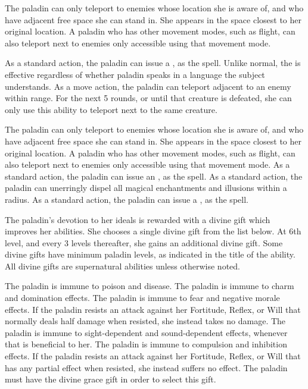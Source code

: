 The paladin can only teleport to enemies whose location she is aware of, and who have adjacent free space she can stand in. She appears in the space closest to her original location. A paladin who has other movement modes, such as flight, can also teleport next to enemies only accessible using that movement mode.

 As a standard action, the paladin can issue a , as the spell. Unlike normal, the  is effective regardless of whether paladin speaks in a language the subject understands.
 As a move action, the paladin can teleport adjacent to an enemy within \rngmed range. For the next 5 rounds, or until that creature is defeated, she can only use this ability to teleport next to the same creature.

The paladin can only teleport to enemies whose location she is aware of, and who have adjacent free space she can stand in. She appears in the space closest to her original location. A paladin who has other movement modes, such as flight, can also teleport next to enemies only accessible using that movement mode.
 As a standard action, the paladin can issue an , as the spell.
 As a standard action, the paladin can unerringly dispel all magical enchantments and illusions within a \arealarge radius.
 As a standard action, the paladin can issue a , as the spell.

 The paladin's devotion to her ideals is rewarded with a divine gift which improves her abilities. She chooses a single divine gift from the list below. At 6th level, and every 3 levels thereafter, she gains an additional divine gift. Some divine gifts have minimum paladin levels, as indicated in the title of the ability. All divine gifts are supernatural abilities unless otherwise noted.

 The paladin is immune to poison and disease.
 The paladin is immune to charm and domination effects.
 The paladin is immune to fear and negative morale effects.
 If the paladin resists an attack against her Fortitude, Reflex, or Will that normally deals half damage when resisted, she instead takes no damage.
 The paladin is immune to sight-dependent and sound-dependent effects, whenever that is beneficial to her.
 The paladin is immune to compulsion and inhibition effects.
 If the paladin resists an attack against her Fortitude, Reflex, or Will that has any partial effect when resisted, she instead suffers no effect. The paladin must have the divine grace gift in order to select this gift.

